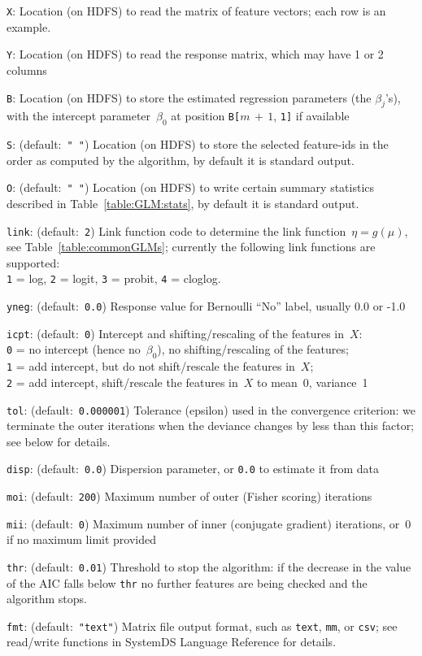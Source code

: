 \smallskip
{}
\begin{Description}
	\item[{\tt X}:]
	Location (on HDFS) to read the matrix of feature vectors; each row is
	an example.
	\item[{\tt Y}:]
	Location (on HDFS) to read the response matrix, which may have 1 or 2 columns
	\item[{\tt B}:]
	Location (on HDFS) to store the estimated regression parameters (the $\beta_j$'s), with the
	intercept parameter~$\beta_0$ at position {\tt B[}$m\,{+}\,1$, {\tt 1]} if available
	\item[{\tt S}:] (default:\mbox{ }{\tt " "})
	Location (on HDFS) to store the selected feature-ids in the order as computed by the algorithm,
	by default it is standard output.
	\item[{\tt O}:] (default:\mbox{ }{\tt " "})
	Location (on HDFS) to write certain summary statistics described in Table~\ref{table:GLM:stats},
	by default it is standard output. 
	\item[{\tt link}:] (default:\mbox{ }{\tt 2})
	Link function code to determine the link function~$\eta = g(\mu)$, see Table~\ref{table:commonGLMs}; currently the following link functions are supported: \\
	{\tt 1} = log,
	{\tt 2} = logit,
	{\tt 3} = probit,
	{\tt 4} = cloglog.
	\item[{\tt yneg}:] (default:\mbox{ }{\tt 0.0})
	Response value for Bernoulli ``No'' label, usually 0.0 or -1.0
	\item[{\tt icpt}:] (default:\mbox{ }{\tt 0})
	Intercept and shifting/rescaling of the features in~$X$:\\
	{\tt 0} = no intercept (hence no~$\beta_0$), no shifting/rescaling of the features;\\
	{\tt 1} = add intercept, but do not shift/rescale the features in~$X$;\\
	{\tt 2} = add intercept, shift/rescale the features in~$X$ to mean~0, variance~1
	\item[{\tt tol}:] (default:\mbox{ }{\tt 0.000001})
	Tolerance (epsilon) used in the convergence criterion: we terminate the outer iterations
	when the deviance changes by less than this factor; see below for details.
	\item[{\tt disp}:] (default:\mbox{ }{\tt 0.0})
	Dispersion parameter, or {\tt 0.0} to estimate it from data
	\item[{\tt moi}:] (default:\mbox{ }{\tt 200})
	Maximum number of outer (Fisher scoring) iterations
	\item[{\tt mii}:] (default:\mbox{ }{\tt 0})
	Maximum number of inner (conjugate gradient) iterations, or~0 if no maximum
	limit provided
	\item[{\tt thr}:] (default:\mbox{ }{\tt 0.01})
	Threshold to stop the algorithm: if the decrease in the value of the AIC falls below {\tt thr}
	no further features are being checked and the algorithm stops.
	\item[{\tt fmt}:] (default:\mbox{ }{\tt "text"})
	Matrix file output format, such as {\tt text}, {\tt mm}, or {\tt csv};
	see read/write functions in SystemDS Language Reference for details.
\end{Description}


